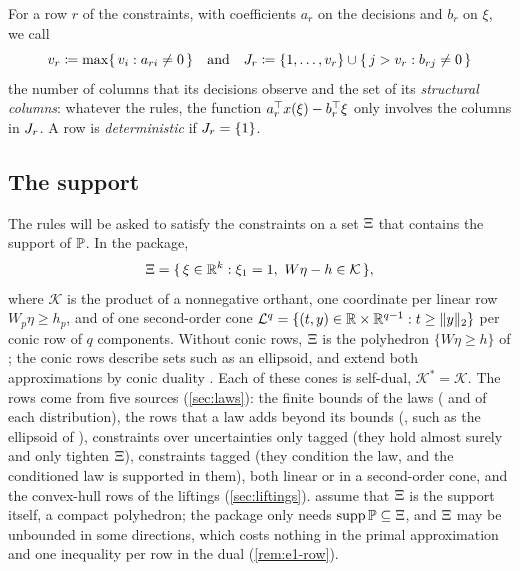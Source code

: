 For a row $r$ of the constraints, with coefficients $a_r$ on the decisions and $b_r$ on $\xi$, we call
\begin{equation}
\label{eq:structural-columns}
v_r \coloneqq \max\{\, v_i : a_{ri} \neq 0 \,\}
\quad\text{and}\quad
J_r \coloneqq \{1, \dots, v_r\} \cup \{\, j > v_r : b_{rj} \neq 0 \,\}
\end{equation}
the number of columns that its decisions observe and the set of its \emph{structural columns}:
whatever the rules, the function $a_r^\top x(\xi) - b_r^\top \xi$ only involves the columns in $J_r$.
A row is \emph{deterministic} if $J_r = \{1\}$.

\subsection{The support}
\label{sec:support}

The rules will be asked to satisfy the constraints on a set $\Xi$ that contains the support of $\mathbb{P}$.
In the package,
\[
\Xi = \{\, \xi \in \mathbb{R}^k : \xi_1 = 1,\ W \eta - h \in \mathcal{K} \,\},
\]
where $\mathcal{K}$ is the product of a nonnegative orthant, one coordinate per linear row $W_p\eta \ge h_p$,
and of one second-order cone $\mathcal{L}^{q} = \{(t, y) \in \mathbb{R} \times \mathbb{R}^{q-1} : t \ge \lVert y \rVert_2\}$ per conic row of $q$ components.
Without conic rows, $\Xi$ is the polyhedron $\{W\eta \ge h\}$ of \citet{KWG2011};
the conic rows describe sets such as an ellipsoid, and extend both approximations by conic duality \citep[Theorem~2.1]{GWK2015}.
Each of these cones is self-dual, $\mathcal{K}^* = \mathcal{K}$.
The rows come from five sources (\cref{sec:laws}):
the finite bounds of the laws ( and  of each distribution),
the rows that a law adds beyond its bounds (, such as the ellipsoid of ),
constraints over uncertainties only tagged  (they hold almost surely and only tighten $\Xi$),
constraints tagged  (they condition the law, and the conditioned law is supported in them),
both linear or in a second-order cone,
and the convex-hull rows of the liftings (\cref{sec:liftings}).
\citet{KWG2011} assume that $\Xi$ is the support itself, a compact polyhedron;
the package only needs $\operatorname{supp}\mathbb{P} \subseteq \Xi$, and $\Xi$ may be unbounded in some directions,
which costs nothing in the primal approximation and one inequality per row in the dual (\cref{rem:e1-row}).

